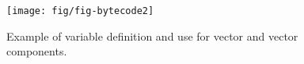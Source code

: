 \begin{figure}[!ht]
\begin{center}
\texttt{[image: fig/fig-bytecode2]}
\caption{Example of variable definition and use for vector and
vector components.}\label{fig-bytecode2}
\end{center}
\end{figure}


\begin{comment}
01 public class VetClone {
02     static Integer cp[];
03
04     Integer[] copy( Integer[] or )
05     {
06         if ( or != null ) {
07             cp = new Integer[or.length];
08             for( int i = 0; i < or.length; i++ )
09             {
10                 cp[i] = new Integer( or[i].intValue() );
11                 print( cp[i] );
12             }
13         }
14         return cp;
15     }
16     public void print( Object obj )
17     {
18         System.out.print( obj.toString() );
19     }
20 }

0:    aload_1
1:    ifnull        #53
4:    aload_1
5:    arraylength
6:    anewarray     <java.lang.Integer>
9:    putstatic     VetClone.cp
12:   iconst_0
13:   istore_2
14:   goto          #47
17:   getstatic     VetClone.cp
20:   iload_2
21:   new           <java.lang.Integer>
24:   dup
25:   aload_1
26:   iload_2
27:   aaload
28:   invokevirtual java.lang.Integer.intValue
31:   invokespecial java.lang.Integer.<init>
34:   aastore
35:   aload_0
36:   getstatic     VetClone.cp
39:   iload_2
40:   aaload
41:   invokevirtual VetClone.print
44:   iinc          %
47:   iload_2
48:   aload_1
49:   arraylength
50:   if_icmplt     #17
53:   getstatic     VetClone.cp
56:   areturn
\end{comment}
